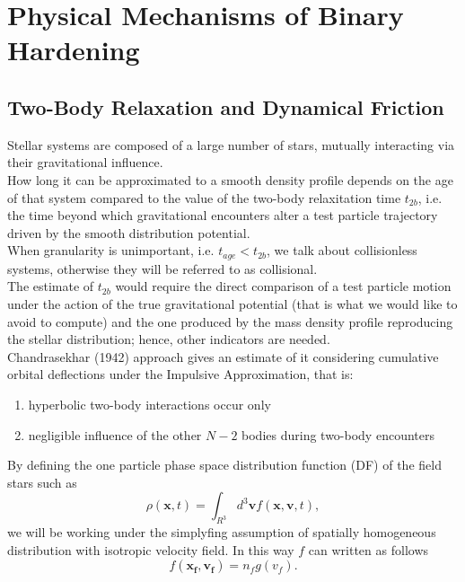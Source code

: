 \chapter{Physical Mechanisms of Binary Hardening}





\section{Two-Body Relaxation and Dynamical Friction}
Stellar systems are composed of a large number of stars, mutually interacting via their gravitational influence.\\How long it can be approximated to a smooth density profile depends on the age of that system compared to the value of the two-body relaxitation time $t_{2b}$, i.e. the time beyond which gravitational encounters alter a test particle trajectory driven by the smooth distribution potential.\\When granularity is unimportant, i.e. $t_{age}<t_{2b}$, we talk about collisionless systems, otherwise they will be referred to as collisional.\\The estimate of $t_{2b}$ would require the direct comparison of a test particle motion under the action of the true gravitational potential (that is what we would like to avoid to compute) and the one produced by the mass density profile reproducing the stellar distribution; hence, other indicators are needed.\\ Chandrasekhar (1942) approach gives an estimate of it considering
cumulative orbital deflections under the Impulsive Approximation, that is:
\begin{enumerate}
    \item hyperbolic two-body interactions occur only
    \item negligible influence of the other $N-2$ bodies during two-body encounters
\end{enumerate}
By defining the one particle phase space distribution function (DF) of the field stars such as
\begin{equation}
\rho(\mathbf{x},t)=\int_{R^3}d^3\mathbf{v}f(\mathbf{x},\mathbf{v},t),
\end{equation}
we will be working under the simplyfing assumption of spatially homogeneous distribution with isotropic velocity field. In this way $f$ can written as follows
\begin{equation}
    f(\mathbf{x_f},\mathbf{v_f})=n_fg(v_f).
\end{equation}

